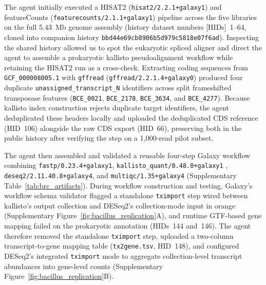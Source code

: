 \documentclass[11pt,letterpaper]{article}
\newcommand{\tool}[1]{\textsf{#1}}
\begin{document}
The agent initially executed a \tool{HISAT2} (\nolinkurl{hisat2/2.2.1+galaxy1}) and \tool{featureCounts} (\nolinkurl{featurecounts/2.1.1+galaxy1}) pipeline across the five libraries on the full 5.43~Mb genome assembly (history dataset numbers [HIDs]~1--64, cloned into companion history \nolinkurl{bbd44e69cb8906b5d979c5818e07f6ad}). Inspecting the shared history allowed us to spot the eukaryotic spliced aligner and direct the agent to assemble a prokaryotic \tool{kallisto} pseudoalignment workflow while retaining the \tool{HISAT2} run as a cross-check. Extracting coding sequences from \nolinkurl{GCF_000008005.1} with \texttt{gffread} (\nolinkurl{gffread/2.2.1.4+galaxy0}) produced four duplicate \nolinkurl{unassigned_transcript_N} identifiers across split frameshifted transposase features (\texttt{BCE\_0021}, \texttt{BCE\_2178}, \texttt{BCE\_3634}, and \texttt{BCE\_4277}). Because \tool{kallisto} index construction rejects duplicate target identifiers, the agent deduplicated these headers locally and uploaded the deduplicated CDS reference (HID~106) alongside the raw CDS export (HID~66), preserving both in the public history after verifying the step on a 1,000-read pilot subset.

The agent then assembled and validated a reusable four-step Galaxy workflow combining \nolinkurl{fastp/0.23.4+galaxy1}, \nolinkurl{kallisto_quant/0.48.0+galaxy1} \cite{bray2016near}, \nolinkurl{deseq2/2.11.40.8+galaxy4}, and \nolinkurl{multiqc/1.35+galaxy4} (Supplementary Table~\ref{tab:brc_artifacts}). During workflow construction and testing, Galaxy's workflow schema validator flagged a standalone \texttt{tximport} step wired between \tool{kallisto}'s output collection and \tool{DESeq2}'s collection-mode input in orange (Supplementary Figure~\ref{fig:bacillus_replication}A), and runtime GTF-based gene mapping failed on the prokaryotic annotation (HIDs~144 and~146). The agent therefore removed the standalone \texttt{tximport} step, uploaded a two-column transcript-to-gene mapping table (\texttt{tx2gene.tsv}, HID~148), and configured \tool{DESeq2}'s integrated \texttt{tximport} mode to aggregate collection-level transcript abundances into gene-level counts (Supplementary Figure~\ref{fig:bacillus_replication}B).
\end{document}
